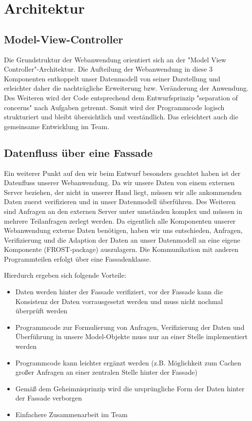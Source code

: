 \section{Architektur}

\subsection{Model-View-Controller}
Die Grundstruktur der Webanwendung orientiert sich an der "Model View Controller"-Architektur. Die Aufteilung der Webanwendung in diese 3 Komponenten entkoppelt unser Datenmodell von seiner Darstellung und erleichter daher die nachträgliche Erweiterung bzw. Veränderung der Anwendung.
Des Weiteren wird der Code entsprechend dem Entwurfsprinzip "separation of concerns" nach Aufgaben getrennt. Somit wird der Programmcode logisch strukturiert und bleibt übersichtlich und verständlich. Das erleichtert auch die gemeinsame Entwicklung im Team.

\subsection{Datenfluss über eine Fassade}
Ein weiterer Punkt auf den wir beim Entwurf besonders geachtet haben ist der Datenfluss unserer Webanwendung. Da wir unsere Daten von einem externen Server beziehen, der nicht in unserer Hand liegt, müssen wir alle ankommenden Daten zuerst verifizieren und in unser Datenmodell überführen. Des Weiteren sind Anfragen an den externen Server unter umständen komplex und müssen in mehrere Teilanfragen zerlegt werden.
Da eigentlich alle Komponenten unserer Webanwendung externe Daten benötigen, haben wir uns entschieden, Anfragen, Verifizierung und die Adaption der Daten an unser Datenmodell an eine eigene Komponente (FROST-package) auszulagern. Die Kommunikation mit anderen Programmteilen erfolgt über eine Fassadenklasse.

Hierdurch ergeben sich folgende Vorteile:
\begin{itemize}
    \item Daten werden hinter der Fassade verifiziert, vor der Fassade kann die Konsistenz der Daten vorrausgesetzt werden und muss nicht nochmal überprüft werden
    \item Programmcode zur Formulierung von Anfragen, Verifizierung der Daten und Überführung in unsere Model-Objekte muss nur an einer Stelle implementiert werden
    \item Programmcode kann leichter ergänzt werden (z.B. Möglichkeit zum Cachen großer Anfragen an einer zentralen Stelle hinter der Fassade)
    \item Gemäß dem Geheimnisprinzip wird die ursprüngliche Form der Daten hinter der Fassade verborgen
    \item Einfachere Zusammenarbeit im Team
\end{itemize}